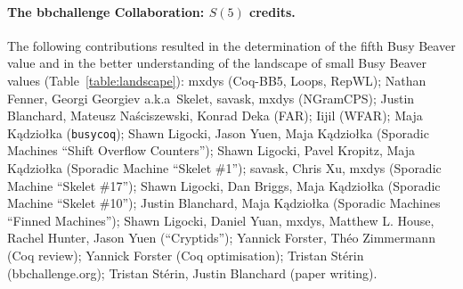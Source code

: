 \documentclass[a4paper,british]{article}
\theoremstyle{definition} %
\numberwithin{equation}{section}
\theoremstyle{definition} %
\newcommand{\CoqBB}{Coq-BB5\xspace}
\begin{document}
\paragraph{The bbchallenge Collaboration: $S(5)$ credits.} The following contributions resulted in the determination of the fifth Busy Beaver value and in the better understanding of the landscape of small Busy Beaver values (Table~\ref{table:landscape}): mxdys (\CoqBB, Loops, RepWL); Nathan Fenner, Georgi Georgiev a.k.a~Skelet, savask, mxdys (NGramCPS); Justin Blanchard, Mateusz Naściszewski, Konrad Deka (FAR); Iijil (WFAR); Maja Kądziołka (\texttt{busycoq}); Shawn Ligocki, Jason Yuen, Maja Kądziołka (Sporadic Machines ``Shift Overflow Counters''); Shawn Ligocki, Pavel Kropitz, Maja Kądziołka (Sporadic Machine ``Skelet \#1''); savask, Chris Xu, mxdys (Sporadic Machine ``Skelet \#17''); Shawn Ligocki, Dan Briggs, Maja Kądziołka (Sporadic Machine ``Skelet \#10''); Justin Blanchard, Maja Kądziołka (Sporadic Machines ``Finned Machines''); Shawn Ligocki, Daniel Yuan, mxdys, Matthew L. House, Rachel Hunter, Jason Yuen (``Cryptids''); Yannick Forster, Théo Zimmermann (Coq review); Yannick Forster (Coq optimisation); Tristan Stérin (bbchallenge.org); Tristan Stérin, Justin Blanchard (paper writing).
\vspace{-1ex}
\end{document}
